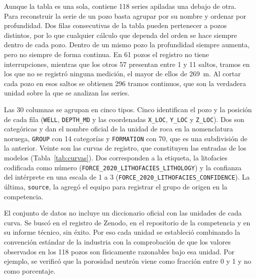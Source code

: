 \documentclass[11pt,a4paper]{article}
\begin{document}
Aunque la tabla es una sola, contiene 118 series apiladas una debajo de otra. Para reconstruir la serie de un pozo basta agrupar por su nombre y ordenar por profundidad. Dos filas consecutivas de la tabla pueden pertenecer a pozos distintos, por lo que cualquier cálculo que dependa del orden se hace siempre dentro de cada pozo. Dentro de un mismo pozo la profundidad siempre aumenta, pero no siempre de forma continua. En 61 pozos el registro no tiene interrupciones, mientras que los otros 57 presentan entre 1 y 11 saltos, tramos en los que no se registró ninguna medición, el mayor de ellos de 269~m. Al cortar cada pozo en esos saltos se obtienen 296 tramos continuos, que son la verdadera unidad sobre la que se analizan las series.

Las 30 columnas se agrupan en cinco tipos. Cinco identifican el pozo y la posición de cada fila (\texttt{WELL}, \texttt{DEPTH\_MD} y las coordenadas \texttt{X\_LOC}, \texttt{Y\_LOC} y \texttt{Z\_LOC}). Dos son categóricas y dan el nombre oficial de la unidad de roca en la nomenclatura noruega, \texttt{GROUP} con 14 categorías y \texttt{FORMATION} con 70, que es una subdivisión de la anterior. Veinte son las curvas de registro, que constituyen las entradas de los modelos (Tabla~\ref{tab:curvas}). Dos corresponden a la etiqueta, la litofacies codificada como número (\texttt{FORCE\_2020\_LITHOFACIES\_LITHOLOGY}) y la confianza del intérprete en una escala de 1 a 3 (\texttt{FORCE\_2020\_LITHOFACIES\_CONFIDENCE}). La última, \texttt{source}, la agregó el equipo para registrar el grupo de origen en la competencia.

El conjunto de datos no incluye un diccionario oficial con las unidades de cada curva. Se buscó en el registro de Zenodo, en el repositorio de la competencia y en su informe técnico, sin éxito. Por eso cada unidad se estableció combinando la convención estándar de la industria con la comprobación de que los valores observados en los 118 pozos son físicamente razonables bajo esa unidad. Por ejemplo, se verificó que la porosidad neutrón viene como fracción entre 0 y 1 y no como porcentaje.
\end{document}
